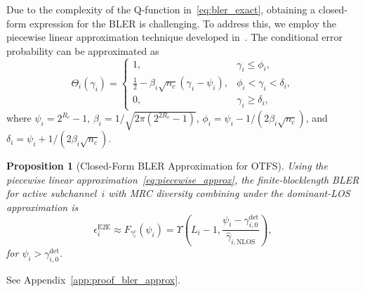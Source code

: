 \documentclass[lettersize,journal]{IEEEtran}
\newtheorem{proposition}{Proposition}
\begin{document}
Due to the complexity of the Q-function in~\eqref{eq:bler_exact}, obtaining a closed-form expression for the BLER is challenging. To address this, we employ the piecewise linear approximation technique developed in~\cite{Makki2014,Basnayaka2022}. The conditional error probability can be approximated as
\begin{equation}
\Theta_i(\gamma_i) =
\begin{cases}
1, & \gamma_i \leq \phi_i, \\
\frac{1}{2} - \beta_i \sqrt{n_c}(\gamma_i - \psi_i), & \phi_i < \gamma_i < \delta_i, \\
0, & \gamma_i \geq \delta_i,
\end{cases}
\label{eq:piecewise_approx}
\end{equation}
where $\psi_i = 2^{R_c} - 1$, $\beta_i = {1}/{\sqrt{2\pi(2^{2R_c} - 1)}}$, $\phi_i = \psi_i - {1}/{(2\beta_i \sqrt{n_c})}$, and $\delta_i = \psi_i + {1}/{(2\beta_i \sqrt{n_c})}$.
\begin{proposition}[Closed-Form BLER Approximation for OTFS]
\label{prop:bler_approx}
Using the piecewise linear approximation~\eqref{eq:piecewise_approx}, the finite-blocklength BLER for active subchannel~$i$ with MRC diversity combining under the dominant-LOS approximation is
\begin{equation}
\epsilon_i^{\mathrm{E2E}} \approx F_{\gamma_i^{\mathrm{c}}}(\psi_i) = \Upsilon\left(L_i-1, \frac{\psi_i - \gamma_{i,0}^{\mathrm{det}}}{\hat{\gamma}_{i,\mathrm{NLOS}}}\right),
\label{eq:bler_cdf_combined}
\end{equation}
for $\psi_i > \gamma_{i,0}^{\mathrm{det}}$.
\end{proposition}

\begin{IEEEproof}
See Appendix~\ref{app:proof_bler_approx}.
\end{IEEEproof}
\end{document}
